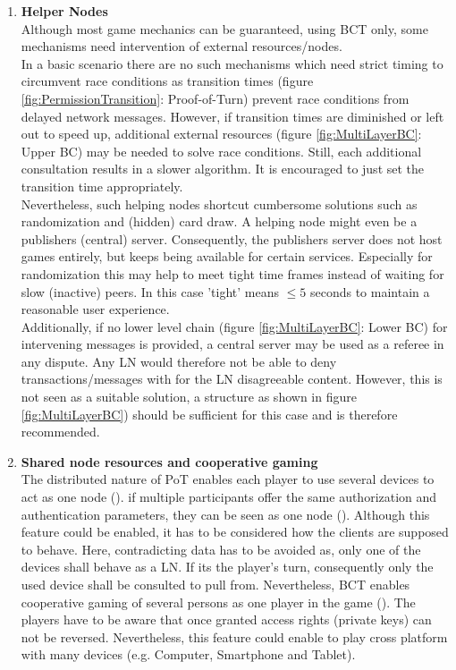 \begin{enumerate}
	\item \textbf{Helper Nodes} \label{sec:HelperNodes} \\
	Although most game mechanics can be guaranteed, using \gls{BCT} only, some mechanisms need intervention of external resources/nodes. \\
	In a basic scenario there are no such mechanisms which need strict timing to circumvent race conditions as transition times (figure \ref{fig:PermissionTransition}: Proof-of-Turn) prevent race conditions from delayed network messages.
	However, if transition times are diminished or left out to speed up, additional external resources (figure \ref{fig:MultiLayerBC}: Upper \gls{BC}) may be needed to solve race conditions.
	Still, each additional consultation results in a slower algorithm.
	It is encouraged to just set the transition time appropriately. \\
	Nevertheless, such helping nodes shortcut cumbersome solutions such as randomization and (hidden) card draw.
	A helping node might even be a publishers (central) server.
	Consequently, the publishers server does not host games entirely, but keeps being available for certain services.
	Especially for randomization this may help to meet tight time frames instead of waiting for slow (inactive) peers.
	In this case 'tight' means $\leq5$ seconds to maintain a reasonable user experience. \\	
	Additionally, if no lower level chain (figure \ref{fig:MultiLayerBC}: Lower \gls{BC}) for intervening messages is provided, a central server may be used as a referee in any dispute.
	Any \gls{LN} would therefore not be able to deny transactions/messages with for the \gls{LN} disagreeable content.
	However, this is not seen as a suitable solution, a structure as shown in figure \ref{fig:MultiLayerBC}) should be sufficient for this case and is therefore recommended.
	
	\item \textbf{Shared node resources and cooperative gaming} \\
	The distributed nature of \gls{PoT} enables each player to use several devices to act as one node (\citet{Harkanson.2020}).
	if multiple participants offer the same authorization and authentication parameters, they can be seen as one node (\citet{Karafiloski.2017}).
	Although this feature could be enabled, it has to be considered how the clients are supposed to behave.
	Here, contradicting data has to be avoided as, only one of the devices shall behave as a \gls{LN}.
	If its the player's turn, consequently only the used device shall be consulted to pull from.
	Nevertheless, \gls{BCT} enables cooperative gaming of
	several persons as one player in the game (\citet{Harkanson.2020}).
	The players have to be aware that once granted access rights (private keys) can not be reversed.
	Nevertheless, this feature could enable to play cross platform with many devices (e.g. Computer, Smartphone and Tablet).
	

\end{enumerate}
